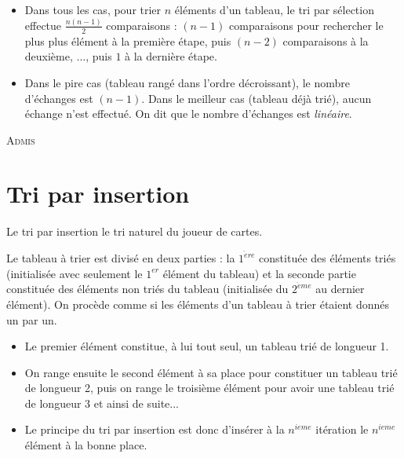 \documentclass[a4paper,french]{article}
\begin{document}
\begin{itemize}
\item Dans tous les cas, pour trier $n$ éléments d'un tableau, le tri par sélection effectue $\displaystyle{\frac{n(n-1)}{2}}$ comparaisons : $(n-1)$ comparaisons pour rechercher le plus plus élément à la première étape, puis $(n-2)$ comparaisons à la deuxième, ..., puis $1$ à la dernière étape.

\item Dans le pire cas (tableau rangé dans l'ordre décroissant), le nombre d'échanges est $(n-1)$. Dans le meilleur cas (tableau déjà trié), aucun échange n'est effectué. On dit que le nombre d'échanges est \textit{linéaire}.
\end{itemize}
\bigskip

\textsc{Admis}
\\

\pagebreak

\section{Tri par insertion}

Le tri par insertion le tri \og naturel \fg du joueur de cartes. 

Le tableau à trier est \og divisé \fg en deux parties : la $1^{\grave{e}re}$ constituée des éléments triés (initialisée avec seulement le $1^{er}$ élément du tableau) et la seconde partie constituée des éléments non triés du tableau (initialisée du $2^{\grave{e}me}$ au dernier élément). On procède comme si les éléments d'un tableau à trier étaient donnés un par un.
\medskip

\begin{itemize}
\item Le premier élément constitue, à lui tout seul, un tableau trié de longueur 1.

\item On range ensuite le second élément \og à sa place \fg pour constituer un tableau trié de longueur 2, puis on range le troisième élément pour avoir une tableau trié de longueur 3 et ainsi de suite... 

\item Le principe du tri par insertion est donc d'insérer à la $n^{ieme}$ itération le $n^{ieme}$ élément à la \og bonne \fg place.
\end{itemize}  
\bigskip
\end{document}
